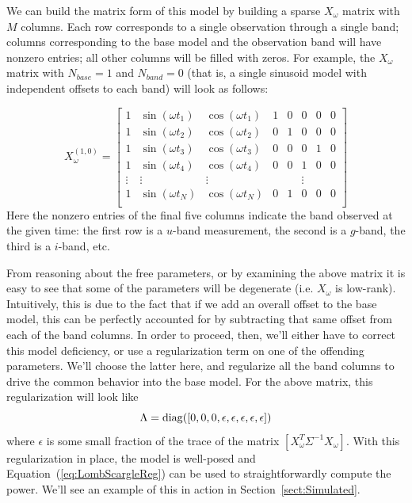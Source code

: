 \documentclass[12pt,preprint]{aastex}
\newcommand{\Eq}[1]{Equation~(\ref{eq:#1})}
\newcommand{\eq}[1]{\Eq{#1}}
\newcommand{\Sect}[1]{Section~\ref{sect:#1}}
\newcommand{\sect}[1]{\Sect{#1}}
\begin{document}
We can build the matrix form of this model by building a sparse $X_{\omega}$ matrix with $M$ columns. Each row corresponds to a single observation through a single band; columns corresponding to the base model and the observation band will have nonzero entries; all other columns will be filled with zeros. For example, the $X_\omega$ matrix with $N_{base}=1$ and $N_{band}=0$ (that is, a single sinusoid model with independent offsets to each band) will look as follows:

\begin{equation}
X_\omega^{(1,0)} = \left[
\begin{array}{cccccccc}
1 & \sin(\omega t_1) & \cos(\omega t_1) & 1 & 0 & 0 & 0 & 0\\
1 & \sin(\omega t_2) & \cos(\omega t_2) & 0 & 1 & 0 & 0 & 0\\
1 & \sin(\omega t_3) & \cos(\omega t_3) & 0 & 0 & 0 & 1 & 0\\
1 & \sin(\omega t_4) & \cos(\omega t_4) & 0 & 0 & 1 & 0 & 0\\
\vdots & \vdots & \vdots & & & \vdots & &\\
1 & \sin(\omega t_N) & \cos(\omega t_N) & 0 & 1 & 0 & 0 & 0\\
\end{array}
\right]
\end{equation}
Here the nonzero entries of the final five columns indicate the band observed at the given time: the first row is a $u$-band measurement, the second is a $g$-band, the third is a $i$-band, etc.

From reasoning about the free parameters, or by examining the above matrix it is easy to see that some of the parameters will be degenerate (i.e. $X_\omega$ is low-rank). Intuitively, this is due to the fact that if we add an overall offset to the base model, this can be perfectly accounted for by subtracting that same offset from each of the band columns. In order to proceed, then, we'll either have to correct this model deficiency, or use a regularization term on one of the offending parameters. We'll choose the latter here, and regularize all the band columns to drive the common behavior into the base model. For the above matrix,
this regularization will look like
\begin{equation}
  \Lambda = {\rm diag}([0, 0, 0, \epsilon, \epsilon, \epsilon, \epsilon, \epsilon])
\end{equation}
where $\epsilon$ is some small fraction of the trace of the matrix $[X_\omega^T\Sigma^{-1}X_\omega]$. With this regularization in place, the model is well-posed and \eq{LombScargleReg} can be used to straightforwardly compute the power. We'll see an example of this in action in \sect{Simulated}.
\end{document}
